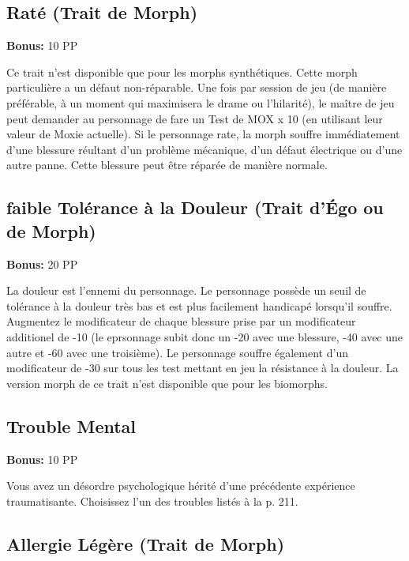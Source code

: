 \subsection{Raté (Trait de Morph)} \label{sec:traits-lemon} 

\textbf{Bonus:} 10 PP 

Ce trait n'est disponible que pour les morphs synthétiques. Cette morph particulière a un défaut non-réparable. Une fois par session de jeu (de manière préférable, à un moment qui maximisera le drame ou l'hilarité), le maître de jeu peut demander au personnage de fare un Test de MOX x 10 (en utilisant leur valeur de Moxie actuelle). Si le personnage rate, la morph souffre immédiatement d'une blessure réultant d'un problème mécanique, d'un défaut électrique ou d'une autre panne. Cette blessure peut être réparée de manière normale. 

\subsection{faible Tolérance à la Douleur (Trait d'Égo ou de Morph)} \label{sec:traits-low-pain-tolerance} 

\textbf{Bonus:} 20 PP 

La douleur est l'ennemi du personnage. Le personnage possède un seuil de tolérance à la douleur très bas et est plus facilement handicapé lorsqu'il souffre. Augmentez le modificateur de chaque blessure prise par un modificateur additionel de -10 (le eprsonnage subit donc un -20 avec une blessure, -40 avec une autre et -60 avec une troisième). Le personnage souffre également d'un modificateur de -30 sur tous les test mettant en jeu la résistance à la douleur. La version morph de ce trait n'est disponible que pour les biomorphs. 

\subsection{Trouble Mental} \label{sec:traits-mental-disorder} 

\textbf{Bonus:} 10 PP 

Vous avez un désordre psychologique hérité d'une précédente expérience traumatisante. Choisissez l'un des troubles listés à la p. 211. 

\subsection{Allergie Légère (Trait de Morph)} \label{sec:traits-mild-allergy} 

